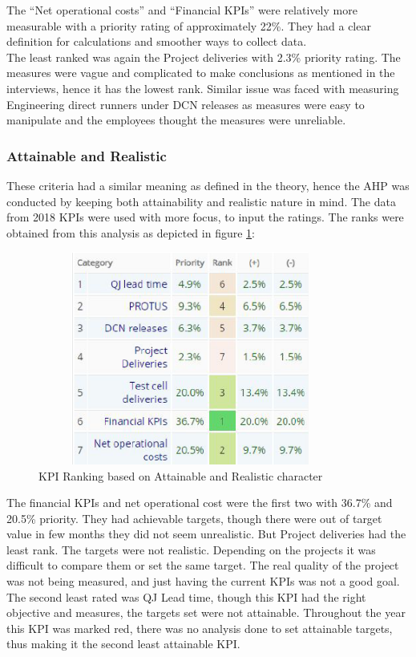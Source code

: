 The “Net operational costs” and “Financial KPIs” were relatively more measurable with a priority rating of approximately 22\%. They had a clear definition for calculations and smoother ways to collect data. \\
The least ranked was again the Project deliveries with 2.3\% priority rating. The measures were vague and complicated to make conclusions as mentioned in the interviews, hence it has the lowest rank. Similar issue was faced with measuring Engineering direct runners under DCN releases as measures were easy to manipulate and the employees thought the measures were unreliable. \\

\subsubsection{Attainable and Realistic}
These criteria had a similar meaning as defined in the theory, hence the AHP was conducted by keeping both attainability and realistic nature in mind. The data from 2018 KPIs were used with more focus, to input the ratings. The ranks were obtained from this analysis as depicted in figure \ref{fig:6.3}:\\
\begin{figure}[H]
    \centering
    \captionsetup{justification=centering, margin=2cm}
    \vspace{1cm}
    \includegraphics[width=10cm, height=7cm]{figure/auxiliary/fig63.PNG}
    \caption{KPI Ranking based on Attainable and Realistic character}
    \label{fig:6.3}
\end{figure}
The financial KPIs and net operational cost were the first two with 36.7\% and 20.5\% priority. They had achievable targets, though there were out of target value in few months they did not seem unrealistic. But Project deliveries had the least rank. The targets were not realistic. Depending on the projects it was difficult to compare them or set the same target. The real quality of the project was not being measured, and just having the current KPIs was not a good goal. The second least rated was QJ Lead time, though this KPI had the right objective and measures, the targets set were not attainable. Throughout the year this KPI was marked red, there was no analysis done to set attainable targets, thus making it the second least attainable KPI.\\

